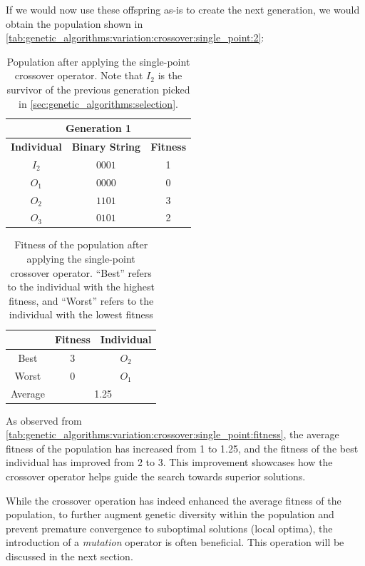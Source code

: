   \endgroup
  If we would now use these offspring as-is to create the next generation, we would obtain the
  population shown in \vref{tab:genetic_algorithms:variation:crossover:single_point:2}:

  \begin{table}[ht!]
    \centering
    \begin{tabular}{c | c | c }
      \multicolumn{3}{c}{\textbf{Generation 1}} \\
      \hline
      \hline
      \textbf{Individual} & \textbf{Binary String}  & \textbf{Fitness} \\
      \hline
      \(I_2\)             & \(0001\)                & 1 \\
      \(O_1\)             & \(0000\)                & 0 \\
      \(O_2\)             & \(1101\)                & 3 \\
      \(O_3\)             & \(0101\)                & 2
    \end{tabular}
    \caption{
      Population after applying the single-point crossover operator.
      Note that \(I_2\) is the survivor of the previous generation picked in 
      \vref{sec:genetic_algorithms:selection}.
    }
    \label{tab:genetic_algorithms:variation:crossover:single_point:2}
  \end{table}

  \begin{table}[H]
    \centering
    \begin{tabular}{|c|c|c|}
      \hline
            & \textbf{Fitness} & \textbf{Individual}  \\
      \hline
      Best  & 3 & \(O_2\) \\
      Worst & 0 & \(O_1\) \\
      \hline
      \hline
      Average & \multicolumn{2}{c|}{1.25} \\
      \hline
    \end{tabular}
    \caption{
      Fitness of the population after applying the single-point crossover operator.
      \enquote{Best} refers to the individual with the highest fitness, and \enquote{Worst} refers 
      to the individual with the lowest fitness
    }
    \label{tab:genetic_algorithms:variation:crossover:single_point:fitness}
  \end{table}

  As observed from \vref{tab:genetic_algorithms:variation:crossover:single_point:fitness}, the 
  average fitness of the population has increased from 1 to 1.25, and the fitness of the best 
  individual has improved from 2 to 3. 
  This improvement showcases how the crossover operator helps guide the search towards superior 
  solutions.

  While the crossover operation has indeed enhanced the average fitness of the population, to 
  further augment genetic diversity within the population and prevent premature convergence to 
  suboptimal solutions (local optima), the introduction of a \emph{mutation} operator is often 
  beneficial. 
  This operation will be discussed in the next section.